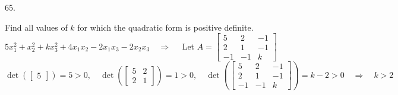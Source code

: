 \documentclass[12pt]{book}
\begin{document}
\begin{CJK}{UTF8}{bsmi}
65. \begin{minipage}[t]{\dimexpr\linewidth-2em}
Find all values of $k$ for which the quadratic form is positive definite. \\
$5x^2_1+x^2_2+kx^2_3+4x_1x_2-2x_1x_3-2x_2x_3\quad\Rightarrow\quad$ Let $A=\begin{bmatrix}
5 & 2 & -1 \\
2 & 1 & -1 \\
-1 & -1 & k
\end{bmatrix}$ \\
$\det\left(\begin{bmatrix}
5
\end{bmatrix}\right)=5>0,\quad\det\left(\begin{bmatrix}
5 & 2 \\
2 & 1
\end{bmatrix}\right)=1>0,\quad\det\left(\begin{bmatrix}
5 & 2 & -1 \\
2 & 1 & -1 \\
-1 & -1 & k
\end{bmatrix}\right)=k-2>0\quad\Rightarrow\quad k>2$
\end{minipage}\\


\end{CJK}
\end{document}
